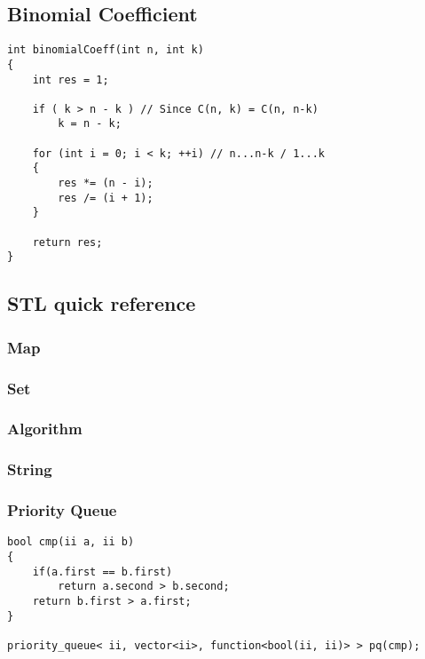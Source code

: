 \documentclass[10pt,oneside]{article}
\begin{document}
\begin{landscape}
\begin{multicols}{2}
\subsection{Binomial Coefficient}

\begin{lstlisting}
int binomialCoeff(int n, int k)
{
    int res = 1;
 
    if ( k > n - k ) // Since C(n, k) = C(n, n-k)
        k = n - k;
 
    for (int i = 0; i < k; ++i) // n...n-k / 1...k
    {
        res *= (n - i);
        res /= (i + 1);
    }
 
    return res;
}
\end{lstlisting}

\subsection{STL quick reference}

\subsubsection{Map}


\subsubsection{Set}


\subsubsection{Algorithm}


\subsubsection{String}

\subsubsection{Priority Queue}

\begin{lstlisting}
bool cmp(ii a, ii b)
{
    if(a.first == b.first)
		return a.second > b.second;
    return b.first > a.first;
}

priority_queue< ii, vector<ii>, function<bool(ii, ii)> > pq(cmp);
\end{lstlisting}


\end{multicols}
\end{landscape}
\end{document}
